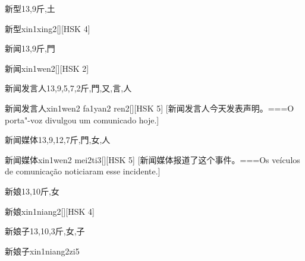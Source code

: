 \begin{Entry}{新型}{13,9}{⽄,⼟}
  \begin{Phonetics}{新型}{xin1xing2}[][HSK 4]
  \end{Phonetics}
\end{Entry}

\begin{Entry}{新闻}{13,9}{⽄,⾨}
  \begin{Phonetics}{新闻}{xin1wen2}[][HSK 2]
  \end{Phonetics}
\end{Entry}

\begin{Entry}{新闻发言人}{13,9,5,7,2}{⽄,⾨,⼜,⾔,⼈}
  \begin{Phonetics}{新闻发言人}{xin1wen2 fa1yan2 ren2}[][HSK 5]
    [新闻发言人今天发表声明。===O porta"-voz divulgou um comunicado hoje.]
  \end{Phonetics}
\end{Entry}

\begin{Entry}{新闻媒体}{13,9,12,7}{⽄,⾨,⼥,⼈}
  \begin{Phonetics}{新闻媒体}{xin1wen2 mei2ti3}[][HSK 5]
    [新闻媒体报道了这个事件。===Os veículos de comunicação noticiaram esse incidente.]
  \end{Phonetics}
\end{Entry}

\begin{Entry}{新娘}{13,10}{⽄,⼥}
  \begin{Phonetics}{新娘}{xin1niang2}[][HSK 4]
  \end{Phonetics}
\end{Entry}

\begin{Entry}{新娘子}{13,10,3}{⽄,⼥,⼦}
  \begin{Phonetics}{新娘子}{xin1niang2zi5}
  \end{Phonetics}
\end{Entry}


